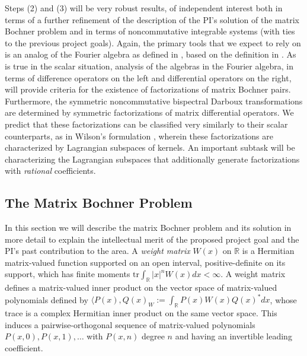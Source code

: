 \documentclass[11pt,letterpaper]{article}
\theoremstyle{definition}
\newcommand{\bbr}{\mathbb{R}}
\newcommand{\vocab}[1]{\emph{#1}}
\newcommand{\tr}{\text{tr}}
\begin{document}
Steps (2) and (3) will be very robust results, of independent interest both in terms of a further refinement of the description of the PI's solution of the matrix Bochner problem \cite{CY2018} and in terms of noncommutative integrable systems (with ties to the previous project goals).
Again, the primary tools that we expect to rely on is an analog of the Fourier algebra as defined in \cite{CY2018}, based on the definition in \cite{CY2019}.
As is true in the scalar situation, analysis of the algebras in the Fourier algebra, in terms of difference operators on the left and differential operators on the right, will provide criteria for the existence of factorizations of matrix Bochner pairs.
Furthermore, the symmetric noncommutative bispectral Darboux transformations are determined by symmetric factorizations of matrix differential operators.
We predict that these factorizations can be classified very similarly to their scalar counterparts, as in Wilson's formulation \cite{wilson1992}, wherein these factorizations are characterized by Lagrangian subspaces of kernels.
An important subtask will be characterizing the Lagrangian subspaces that additionally generate factorizations with \emph{rational} coefficients.

\subsection{The Matrix Bochner Problem}
In this section we will describe the matrix Bochner problem and its solution in more detail to explain the intellectual merit of the proposed project goal and the PI's past contribution to the area.
A \vocab{weight matrix} $W(x)$ on $\bbr$ is a Hermitian matrix-valued function supported on an open interval, positive-definite on its support, which has finite moments $\tr\int_{\bbr} |x|^nW(x)dx <\infty$.
A weight matrix defines a matrix-valued inner product on the vector space of matrix-valued polynomials defined by $\langle P(x),Q(x)_W := \int_{\bbr} P(x)W(x)Q(x)^*dx$, whose trace is a complex Hermitian inner product on the same vector space.  This induces a pairwise-orthogonal sequence of matrix-valued polynomials $P(x,0),P(x,1),\dots$ with $P(x,n)$ degree $n$ and having an invertible leading coefficient.
\end{document}

